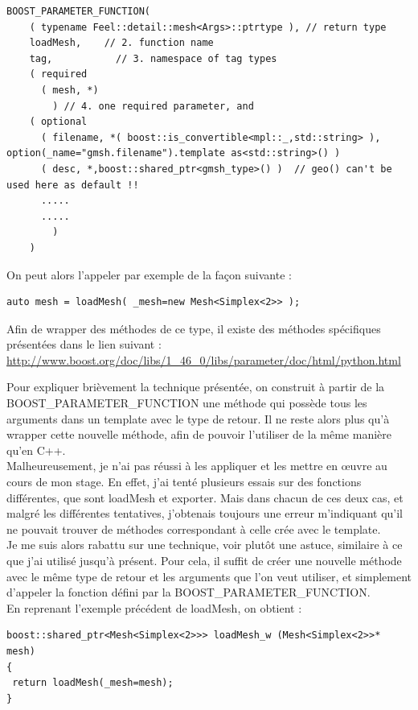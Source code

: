 \documentclass[french,12pt]{article}
\begin{document}
\begin{lstlisting}
BOOST_PARAMETER_FUNCTION(
    ( typename Feel::detail::mesh<Args>::ptrtype ), // return type
    loadMesh,    // 2. function name
    tag,           // 3. namespace of tag types
    ( required
      ( mesh, *)
        ) // 4. one required parameter, and
    ( optional
      ( filename, *( boost::is_convertible<mpl::_,std::string> ), option(_name="gmsh.filename").template as<std::string>() )
      ( desc, *,boost::shared_ptr<gmsh_type>() )  // geo() can't be used here as default !!
      .....
      .....
        )
    )
\end{lstlisting}
On peut alors l'appeler par exemple de la façon suivante : 
\begin{lstlisting}
auto mesh = loadMesh( _mesh=new Mesh<Simplex<2>> );
\end{lstlisting}

Afin de wrapper des méthodes de ce type, il existe des méthodes spécifiques présentées dans le lien suivant :\\
\url{http://www.boost.org/doc/libs/1_46_0/libs/parameter/doc/html/python.html}
\vspace{0.5 cm}

Pour expliquer brièvement la technique présentée, on construit à partir de la BOOST\_PARAMETER\_FUNCTION une méthode qui possède tous les arguments dans un template avec le type de retour. Il ne reste alors plus qu'à wrapper cette nouvelle méthode, afin de pouvoir l'utiliser de la même manière qu'en C++.\\

Malheureusement, je n'ai pas réussi à les appliquer et les mettre en œuvre au cours de mon stage.
En effet, j'ai tenté plusieurs essais sur des fonctions différentes, que sont loadMesh et exporter. Mais dans chacun de ces deux cas, et malgré les différentes tentatives, j'obtenais toujours une erreur m'indiquant qu'il ne pouvait trouver de méthodes correspondant à celle crée avec le template.\\

Je me suis alors rabattu sur une technique, voir plutôt une astuce, similaire à ce que j'ai utilisé jusqu'à présent. 
Pour cela, il suffit de créer une nouvelle méthode avec le même type de retour et les arguments que l'on veut utiliser, et simplement d'appeler la fonction défini par la BOOST\_PARAMETER\_FUNCTION.\\
En reprenant l'exemple précédent de loadMesh, on obtient :
\begin{lstlisting}
boost::shared_ptr<Mesh<Simplex<2>>> loadMesh_w (Mesh<Simplex<2>>* mesh)
{
 return loadMesh(_mesh=mesh);
}
\end{lstlisting}
\end{document}
